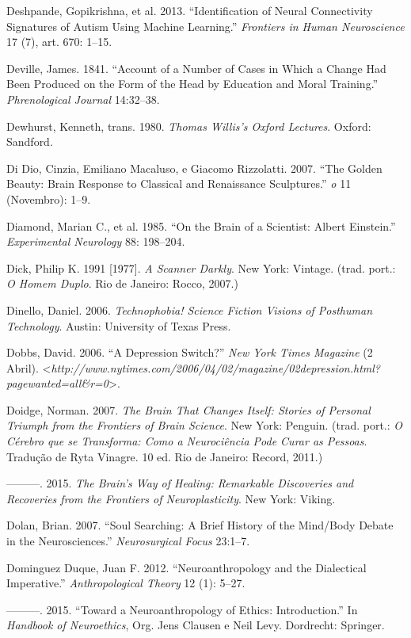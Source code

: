 Deshpande, Gopikrishna, et al. 2013. ``Identification of Neural
Connectivity Signatures of Autism Using Machine Learning.''
\emph{Frontiers in Human Neuroscience} 17 (7), art. 670: 1--15.

Deville, James. 1841. ``Account of a Number of Cases in Which a Change
Had Been Produced on the Form of the Head by Education and Moral
Training.'' \emph{Phrenological Journal} 14:32--38.

Dewhurst, Kenneth, trans. 1980. \emph{Thomas Willis's Oxford Lectures}.
Oxford: Sandford.

Di Dio, Cinzia, Emiliano Macaluso, e Giacomo Rizzolatti. 2007. ``The
Golden Beauty: Brain Response to Classical and Renaissance Sculptures.''
\emph{o} 11 (Novembro): 1--9.

Diamond, Marian C., et al. 1985. ``On the Brain of a Scientist: Albert
Einstein.'' \emph{Experimental Neurology} 88: 198--204.

Dick, Philip K. 1991 {[}1977{]}. \emph{A Scanner Darkly}. New York:
Vintage. (trad. port.: \emph{O Homem Duplo}. Rio de Janeiro: Rocco,
2007.)

Dinello, Daniel. 2006. \emph{Technophobia! Science Fiction Visions of
Posthuman Technology}. Austin: University of Texas Press.

Dobbs, David. 2006. ``A Depression Switch?'' \emph{New York Times
Magazine} (2 Abril).
\textless{}\emph{http://www.nytimes.com/2006/04/02/magazine/02depression.html?pagewanted=all\&r=0}\textgreater{}.

Doidge, Norman. 2007. \emph{The Brain That Changes Itself: Stories of
Personal Triumph from the Frontiers of Brain Science}. New York:
Penguin. (trad. port.: \emph{O Cérebro que se Transforma: Como a
Neurociência Pode Curar as Pessoas}. Tradução de Ryta Vinagre. 10 ed.
Rio de Janeiro: Record, 2011.)

---------. 2015. \emph{The Brain's Way of Healing: Remarkable
Discoveries and Recoveries from the Frontiers of Neuroplasticity}. New
York: Viking.

Dolan, Brian. 2007. ``Soul Searching: A Brief History of the Mind/Body
Debate in the Neurosciences.'' \emph{Neurosurgical Focus} 23:1--7.

Dominguez Duque, Juan F. 2012. ``Neuroanthropology and the Dialectical
Imperative.'' \emph{Anthropological Theory} 12 (1): 5--27.

---------. 2015. ``Toward a Neuroanthropology of Ethics: Introduction.''
In \emph{Handbook of Neuroethics}, Org. Jens Clausen e Neil Levy.
Dordrecht: Springer.

